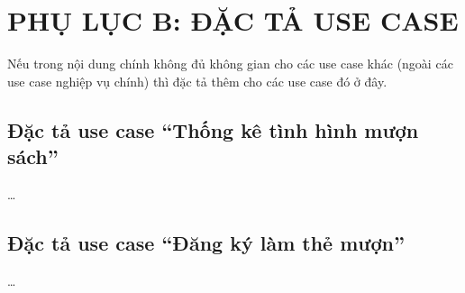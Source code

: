 \chapter*{PHỤ LỤC B: ĐẶC TẢ USE CASE}
Nếu trong nội dung chính không đủ không gian cho các use case khác (ngoài các use case nghiệp vụ chính) thì đặc tả thêm cho các use case đó ở đây.

\section*{Đặc tả use case ``Thống kê tình hình mượn sách''}
\ldots

\section*{Đặc tả use case ``Đăng ký làm thẻ mượn''}
\ldots
